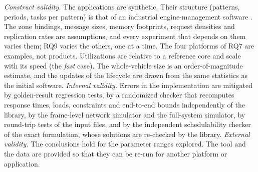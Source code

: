 \emph{Construct validity.} The applications are synthetic. Their structure
(patterns, periods, tasks per pattern) is that of an industrial
engine-management software \cite{kramer2015waters}. The zone bindings,
message sizes, memory footprints, request densities and replication rates
are assumptions, and every experiment that depends on them varies them;
RQ9 varies the others, one at a time. The four platforms of RQ7 are
examples, not products.
Utilizations are relative to a reference core and scale with its speed
(the \emph{fast} case). The whole-vehicle size is an order-of-magnitude
estimate, and the updates of the lifecycle are drawn from the same
statistics as the initial software.
\emph{Internal validity.} Errors in the implementation are mitigated by
golden-result regression tests, by a randomized checker that recomputes
response times, loads, constraints and end-to-end bounds independently of
the library, by the frame-level network simulator and the full-system simulator, by
round-trip tests of the input files, and by the independent
schedulability checker of the exact formulation, whose solutions are
re-checked by the library.
\emph{External validity.} The conclusions hold for the parameter ranges
explored. The tool and the data are provided so that they can be re-run
for another platform or application.
